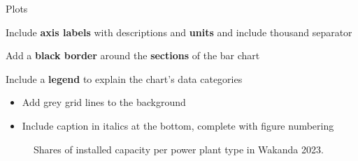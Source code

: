 \documentclass[aspectratio=169]{beamer}
\begin{document}
\begin{frame}{Plots}
\begin{minipage}[t]{0.49\textwidth}
\begin{minipage}[c]{0.84\textwidth}
\begin{coloredblock}[blue][][][1.5cm]
            \end{coloredblock}
            \begin{coloredblock}[yellow][][][1.5cm]
                \footnotesize
                Include \textbf{axis labels} with descriptions and \textbf{units} and include thousand separator
            \end{coloredblock}
            \begin{coloredblock}[grey][][][1.5cm]
                \footnotesize
                Add a \textbf{black border} around the \textbf{sections} of the bar chart
            \end{coloredblock}
            \begin{coloredblock}[green][][][1.5cm]
                \footnotesize
                Include a \textbf{legend} to explain the chart's data categories
            \end{coloredblock}
        \end{minipage}
        \begin{coloredblock}
                \begin{itemize}
                    \item \footnotesize Add grey grid lines to the background
                    \item \footnotesize Include caption in italics at the bottom, complete with figure numbering
                \end{itemize}
        \end{coloredblock}
    \end{minipage}
    \hfill
    \begin{minipage}[t]{0.49\textwidth}
        \vspace{0.1cm}
        \tiny
        \begin{figure}[htbp]
            \caption{\centering Shares of installed capacity per power plant type in Wakanda 2023.}
            \label{fig:installed_capacity_2023}
        \end{figure}
    \end{minipage}


\end{frame}
\end{document}
